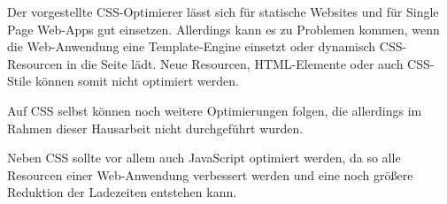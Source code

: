 Der vorgestellte CSS-Optimierer lässt sich für statische Websites und für Single Page Web-Apps gut einsetzen. Allerdings kann es zu Problemen kommen, wenn die Web-Anwendung eine Template-Engine einsetzt oder dynamisch CSS-Resourcen in die Seite lädt. Neue Resourcen, HTML-Elemente oder auch CSS-Stile können somit nicht optimiert werden. 

Auf CSS selbst können noch weitere Optimierungen folgen, die allerdings im Rahmen dieser Hausarbeit nicht durchgeführt wurden. 

Neben CSS sollte vor allem auch JavaScript optimiert werden, da so alle Resourcen einer Web-Anwendung verbessert werden und eine noch größere Reduktion der Ladezeiten entstehen kann. 
